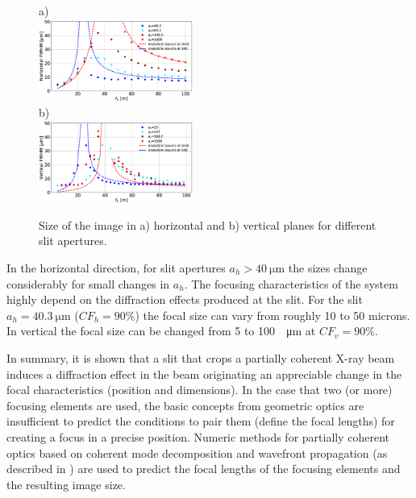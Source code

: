 \documentclass[doublecol]{epl2}
\newcommand{\inred}[1]{{\color{black}#1}} %
\begin{document}
\begin{figure}[H]
a)\\
\hspace{-3cm}
    \includegraphics[width=0.45\textwidth]{sizes_h.eps}\\
b)\\
\hspace{-2.0cm}
    \includegraphics[width=0.45\textwidth]{sizes_v.eps}

    \caption{
    \label{fig:focalSizes}
    Size of the image in a) horizontal and b) vertical planes for different slit apertures.
    }
\end{figure}
In the horizontal direction, for slit apertures $a_h>\SI{40}{\micro\meter}$ the sizes change considerably for small changes in $a_h$. The focusing characteristics of the system highly depend on the diffraction effects produced at the slit. For the slit $a_h=\SI{40.3}{\micro\meter}$ ($CF_h=90\%$) the focal size can vary from roughly 10 to 50 microns. In vertical the focal size can be changed from 5 to 100~\SI{}{\micro\meter} at $CF_v=90\%$.

In summary, it is shown that a slit that crops a partially coherent X-ray beam induces \inred{a} diffraction effect in the beam originating an appreciable change in the focal characteristics (position and dimensions). In the case that two (or more) focusing elements are used, the basic concepts from geometric optics are insufficient to predict the conditions to pair them (define the focal lengths) for creating a focus in a precise position. Numeric methods for partially coherent optics based on coherent mode decomposition and wavefront propagation (as described in \cite{multioptics}) are used to predict the focal lengths of the focusing elements and the resulting image size.   
\end{document}
